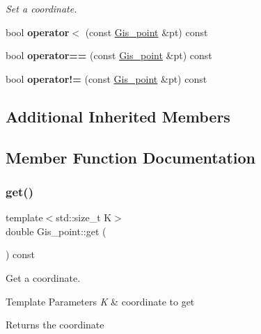 \begin{DoxyCompactItemize}
\begin{DoxyCompactList}\small\item\em Set a coordinate. \end{DoxyCompactList}\item 
\mbox{\label{classGis__point_a4a59b9884d0b59b3c2993103d68019f7}} 
bool {\bfseries operator$<$} (const \mbox{\hyperlink{classGis__point}{Gis\+\_\+point}} \&pt) const
\item 
\mbox{\label{classGis__point_aefe8ea7acd67984e5bc39c63002dac41}} 
bool {\bfseries operator==} (const \mbox{\hyperlink{classGis__point}{Gis\+\_\+point}} \&pt) const
\item 
\mbox{\label{classGis__point_aa75839705316d1bb769358603bca610a}} 
bool {\bfseries operator!=} (const \mbox{\hyperlink{classGis__point}{Gis\+\_\+point}} \&pt) const
\end{DoxyCompactItemize}
\subsection*{Additional Inherited Members}


\subsection{Member Function Documentation}
\mbox{\label{classGis__point_aa7ec388d5e99b76956e5b50b4ba3a500}} 
\subsubsection{\texorpdfstring{get()}{get()}}
{\footnotesize\ttfamily template$<$std\+::size\+\_\+t K$>$ \\
double Gis\+\_\+point\+::get (\begin{DoxyParamCaption}{ }\end{DoxyParamCaption}) const\hspace{0.3cm}{\ttfamily [inline]}}



Get a coordinate. 


\begin{DoxyTemplParams}{Template Parameters}
{\em K} & coordinate to get \\
\hline
\end{DoxyTemplParams}
\begin{DoxyReturn}{Returns}
the coordinate 
\end{DoxyReturn}
\mbox{\label{classGis__point_a2b94bce44d9e070a8d4795d8c0a3654d}} 
